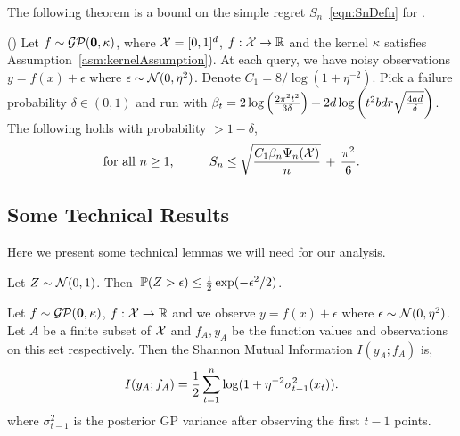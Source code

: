 The following theorem is a bound on the simple regret $S_n$~\eqref{eqn:SnDefn} for \gpucb.

\begin{theorem}(\cite{srinivas10gpbandits})
\label{thm:gpucb}
Let $f\sim\mathcal{G}\mathcal{P}({\bf 0},\kappa)$, where $\mathcal{X}=[0,1]^d$,
$f:\mathcal{X}\rightarrow\mathbb{R}$ and the kernel $\kappa$ satisfies
Assumption~\ref{asm:kernelAssumption}).
At each query, we have noisy observations
$y = f(x) + \epsilon$ where $\epsilon\sim\mathcal{N}(0,\eta^2)$.
Denote $C_1 = 8/\log(1+\eta^{-2})$.
Pick a failure probability $\delta\in(0,1)$ and run \emph{\gpucbs} with
  $\beta_t = 2\log\left(\frac{2\pi^2t^2}{3\delta}\right) + 
  2d\log\left(t^2bdr\sqrt{\frac{4ad}{\delta}}\right)$.
The following holds with probability $>1-\delta$,
\vspace{-0.02in}
\[
\text{for all $n\geq 1$,}
\hspace{0.4in}
S_n \leq \sqrt{\frac{C_1\beta_n\Psi_{n}(\mathcal{X})}{n}} \,+\, \frac{\pi^2}{6}.
\]
\end{theorem}


\subsection{Some Technical Results}
\label{sec:technical}

Here we present some technical lemmas we will need for our analysis.

\begin{lemma}
\label{lem:gaussConcentration}
Let $Z\sim\mathcal{N}(0,1)$. Then $\;\mathbb{P}(Z>\epsilon) \leq \frac{1}{2}\exp(-\epsilon^2/2)$.
\end{lemma}

\begin{lemma}
\label{lem:IGformula}
Let $f\sim\mathcal{G}\mathcal{P}({\bf 0},\kappa)$, $f:\mathcal{X}\rightarrow\mathbb{R}$ and we observe
$y=f(x) + \epsilon$ where $\epsilon\sim\mathcal{N}(0,\eta^2)$. Let $A$ be a finite
subset of $\mathcal{X}$ and $f_A,y_A$ be the function values and observations on this set
respectively. Then the Shannon Mutual Information
$I(y_A;f_A)$ is,
\[
I(y_A; f_A) = \frac{1}{2} \sum_{t=1}^{n} \log(1 + \eta^{-2}
  \sigma^2_{t-1}(x_t) ).
\]
where $\sigma^2_{t-1}$ is the posterior GP variance after observing the first $t-1$
points. 
\end{lemma}

